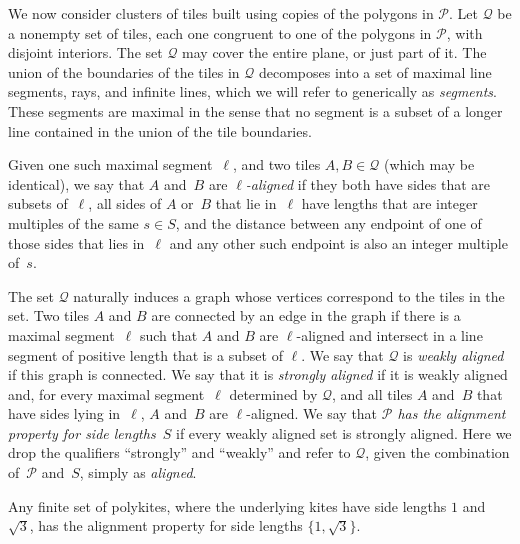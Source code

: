 We now consider clusters of tiles built using copies of the polygons
in $\mathcal{P}$.  Let $\mathcal{Q}$ be a nonempty set of tiles, each
one congruent
to one of the polygons in $\mathcal{P}$, with disjoint interiors.  
The set $\mathcal{Q}$ may cover the entire plane, or just part of it.
The union of the boundaries of the tiles in $\mathcal{Q}$ decomposes
into a set of maximal line segments, rays, and infinite lines, which we will
refer to generically as \textit{segments}.  These segments are maximal
in the sense that no segment is a subset of a longer line contained in
the union of the tile boundaries.

Given one such maximal segment~$\ell$, and two tiles $A, B\in\mathcal{Q}$
(which may be identical), we say that $A$ and~$B$ are \emph{$\ell$-aligned}
if they both have sides that are subsets of~$\ell$, all sides of $A$
or~$B$ that lie in~$\ell$ have lengths that are integer multiples of
the same $s\in S$, and the distance between any endpoint of
one of those sides that lies in~$\ell$ and any other such endpoint is
also an integer multiple of~$s$.

The set $\mathcal{Q}$ naturally induces a graph whose vertices correspond
to the tiles in the set.  Two tiles $A$ and $B$ are connected by an edge
in the graph if there is a maximal segment~$\ell$ such that $A$ and $B$
are $\ell$-aligned and intersect in a line segment of positive length
that is a subset of $\ell$.
We say that $\mathcal{Q}$ is \emph{weakly aligned} if this graph is 
connected.  We say that it is \emph{strongly aligned} if it is weakly 
aligned and, for every maximal segment~$\ell$ determined by $\mathcal{Q}$,
and all tiles $A$ and~$B$ that have sides
lying in~$\ell$, $A$ and~$B$ are $\ell$-aligned.  We say that
\emph{$\mathcal{P}$ has the alignment property for side
lengths~$S$} if every weakly aligned set is strongly
aligned.  Here we drop the qualifiers ``strongly'' and ``weakly'' and refer 
to $\mathcal{Q}$, given the combination
of~$\mathcal{P}$ and~$S$, simply as \emph{aligned}.

\begin{lemma}
Any finite set of polykites, where the underlying kites have side
lengths $1$ and~$\sqrt{3}$, has the alignment property for side
lengths $\{1,\sqrt{3}\}$.
\end{lemma}

